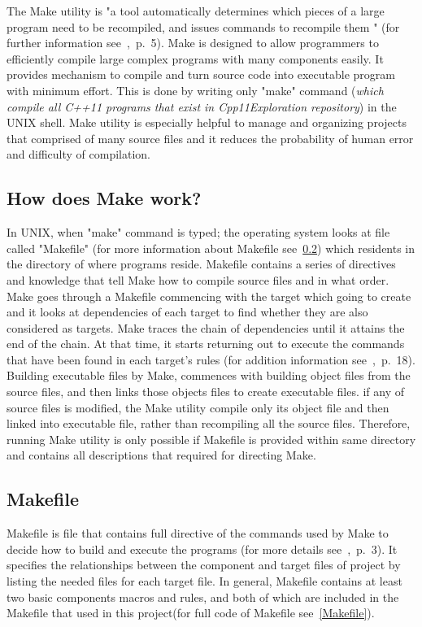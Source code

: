 \documentclass[11pt]{report}
\begin{document}
The Make utility is "a tool automatically determines which pieces of a large program need to be recompiled, and issues commands to recompile them " (for further information see~\cite{Stallman:2000:GnuMake},~p.~5). Make is designed to allow programmers to efficiently compile large complex programs with many components easily. It provides mechanism to compile and turn source code into executable program with minimum effort. This is done by writing only "make" command (\emph{which compile all C++11 programs that exist in Cpp11Exploration repository}) in the UNIX shell. Make utility is especially helpful to manage and organizing projects that comprised of many source files and it reduces the probability of human error and difficulty of compilation.

\subsection{How does Make work?}
\label{subsec: how make work}
In UNIX, when "make" command is typed; the operating system looks at file called "Makefile" (for more information about Makefile see~\ref{subsec: makefile}) which residents in the directory of where programs reside. Makefile contains a series of directives and knowledge that tell Make how to compile source files and in what order. Make goes through a Makefile commencing with the target which going to create and it looks at dependencies of each target to find whether they are also considered as targets.  Make traces the chain of dependencies until it attains the end of the chain. At that time, it starts returning out to execute the commands that have been found in each target's rules (for addition information see~\cite{Stallman:2000:GnuMake},~p.~18). Building executable files by Make, commences with building object files from the source files, and then links those objects files to create executable files. if any of source files is modified, the Make utility compile only its object file and then linked into executable file, rather than recompiling all the source files. Therefore, running Make utility is only possible if Makefile is provided within same directory and contains all descriptions that required for directing Make.

\subsection{Makefile}
\label{subsec: makefile}
Makefile is file that contains full directive of the commands used by Make to decide how to build and execute the programs (for more details see~\cite{Mecklenburg:2004:MakeGun},~p.~3). It specifies the relationships between the component and target files of project by listing the needed files for each target file. In general, Makefile contains at least two basic components macros and rules, and both of which are included in the Makefile that used in this project(for full code of Makefile see~\ref{Makefile}).
\end{document}

